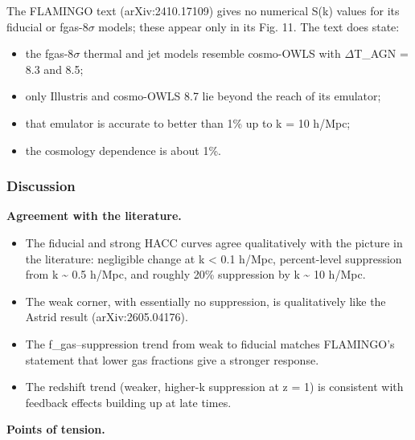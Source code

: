 \documentclass[11pt,a4paper]{article}
\begin{document}
The FLAMINGO text (arXiv:2410.17109) gives no numerical S(k) values for its fiducial or fgas-8$\sigma$ models; these appear only in its Fig. 11. The text does state:

\begin{itemize}
  \item the fgas-8$\sigma$ thermal and jet models resemble cosmo-OWLS with $\Delta$T\_AGN = 8.3 and 8.5;
  \item only Illustris and cosmo-OWLS 8.7 lie beyond the reach of its emulator;
  \item that emulator is accurate to better than 1\% up to k = 10 h/Mpc;
  \item the cosmology dependence is about 1\%.
\end{itemize}
\subsubsection*{Discussion}
\textbf{Agreement with the literature.}

\begin{itemize}
  \item The fiducial and strong HACC curves agree qualitatively with the picture in the literature: negligible change at k \textless{} 0.1 h/Mpc, percent-level suppression from k \textasciitilde{} 0.5 h/Mpc, and roughly 20\% suppression by k \textasciitilde{} 10 h/Mpc.
  \item The weak corner, with essentially no suppression, is qualitatively like the Astrid result (arXiv:2605.04176).
  \item The f\_gas--suppression trend from weak to fiducial matches FLAMINGO's statement that lower gas fractions give a stronger response.
  \item The redshift trend (weaker, higher-k suppression at z = 1) is consistent with feedback effects building up at late times.
\end{itemize}
\textbf{Points of tension.}
\end{document}
